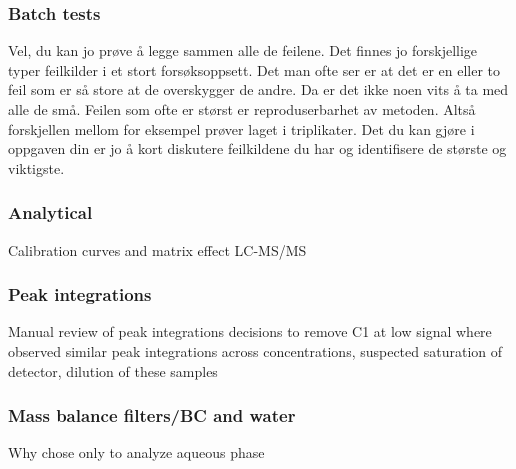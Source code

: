 \subsubsection{Batch tests}
Vel, du kan jo prøve å legge sammen alle de feilene. Det finnes jo forskjellige typer feilkilder i et stort forsøksoppsett. Det man ofte ser er at det er en eller to feil som er så store at de overskygger de andre. Da er det ikke noen vits å ta med alle de små. Feilen som ofte er størst er reproduserbarhet av metoden. Altså forskjellen mellom for eksempel prøver laget i triplikater. Det du kan gjøre i oppgaven din er jo å kort diskutere feilkildene du har og identifisere de største og viktigste.

\subsubsection{Analytical}
Calibration curves and matrix effect
LC-MS/MS

\subsubsection{Peak integrations}
Manual review of peak integrations
decisions to remove C1 at low signal
where observed similar peak integrations across concentrations, suspected saturation of detector, dilution of these samples

\subsubsection{Mass balance filters/BC and water}
Why chose only to analyze aqueous phase
